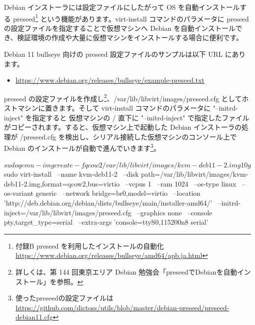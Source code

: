 \documentclass[mingoth,a4paper]{jsarticle}
\begin{document}



Debian インストーラには設定ファイルにしたがって OS を自動インストールする preseed\footnote{付録B preseed を利用したインストールの自動化 \url{https://www.debian.org/releases/bullseye/amd64/apb.ja.html}} という機能があります。virt-install コマンドのパラメータに preseed の設定ファイルを指定することで仮想マシンへ Debian を自動インストールでき、検証環境の作成や大量に仮想マシンをインストールする場合に便利です。

Debian 11 bullseye 向けの preseed 設定ファイルのサンプルは以下 URL にあります。

\begin{itemize}
\item \url{https://www.debian.org/releases/bullseye/example-preseed.txt}
\end{itemize}

preseed の設定ファイルを作成し\footnote{詳しくは、第 144 回東京エリア Debian 勉強会「preseedでDebianを自動インストール」を参照。}、/var/lib/libvirt/images/preseed.cfg としてホストマシンに置きます。そして virt-install コマンドのパラメータに "--initrd-inject" を指定すると 仮想マシンの / 直下に "--initrd-inject" で指定したファイルがコピーされます。すると、仮想マシン上で起動した Debian インストーラの処理が /preseed.cfg を検出し、シリアル接続した仮想マシンのコンソール上で Debian のインストールが自動で進んでいきます\footnote{使ったpreseedの設定ファイルは \url{https://github.com/dictoss/utils/blob/master/debian-preseed/preseed-debian11.cfg}}。

\begin{commandline}
$ sudo qemu-img create -f qcow2 /var/lib/libvirt/images/kvm-deb11-2.img 10g
  
$ sudo virt-install \
--name kvm-deb11-2 \
--disk path=/var/lib/libvirt/images/kvm-deb11-2.img,format=qcow2,bus=virtio \
--vcpus 1 \
--ram 1024 \
--os-type linux \
--os-variant generic \
--network bridge=br0,model=virtio \
--location 'http://deb.debian.org/debian/dists/bullseye/main/installer-amd64/' \
--initrd-inject=/var/lib/libvirt/images/preseed.cfg \
--graphics none \
--console pty,target_type=serial \
--extra-args 'console=ttyS0,115200n8 serial'
\end{commandline}
\end{document}
